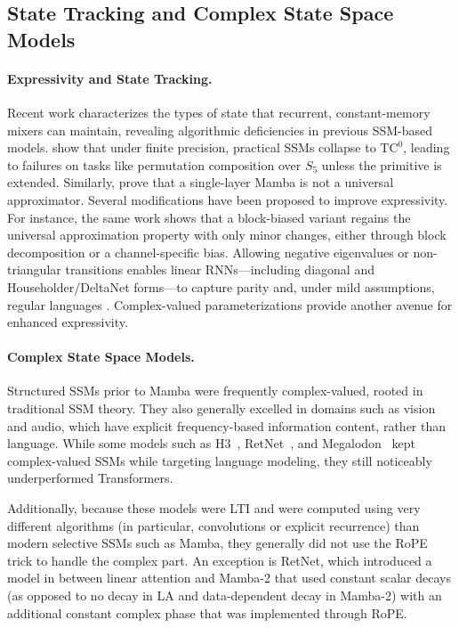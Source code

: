 \documentclass{article}
\newcommand{\citep}{\parencite}
\newcommand{\citet}{\textcite}
\theoremstyle{plain}
\theoremstyle{definition}
\theoremstyle{remark}
\begin{document}
\subsection{State Tracking and Complex State Space Models}

\paragraph{Expressivity and State Tracking.}
Recent work characterizes the types of state that recurrent, constant-memory mixers can maintain, revealing algorithmic deficiencies in previous SSM-based models. \citet{merrill2025illusionstatestatespacemodels} show that under finite precision, practical SSMs collapse to $\mathrm{TC}^0$, leading to failures on tasks like permutation composition over $S_5$ unless the primitive is extended.
Similarly, \citet{yu2025blockbiasedmamba} prove that a single-layer Mamba is not a universal approximator. Several modifications have been proposed to improve expressivity. For instance, the same work shows that a block-biased variant regains the universal approximation property with only minor changes, either through block decomposition or a channel-specific bias. Allowing negative eigenvalues or non-triangular transitions enables linear RNNs---including diagonal and Householder/DeltaNet forms---to capture parity and, under mild assumptions, regular languages \citep{grazzi2025unlockingstatetrackinglinearrnns}. Complex-valued parameterizations provide another avenue for enhanced expressivity.

\paragraph{Complex State Space Models.}
Structured SSMs prior to Mamba were frequently complex-valued, rooted in traditional SSM theory.
They also generally excelled in domains such as vision and audio, which have explicit frequency-based information content, rather than language.
While some models such as H3~\citep{fu2023hungryhungryhipposlanguage}, RetNet~\citep{sun2023retentivenetworksuccessortransformer}, and Megalodon~\citep{ma2024megalodonefficientllmpretraining} kept complex-valued SSMs while targeting language modeling, they still noticeably underperformed Transformers.

Additionally, because these models were LTI and were computed using very different algorithms (in particular, convolutions or explicit recurrence) than modern selective SSMs such as Mamba, they generally did not use the RoPE trick to handle the complex part.
An exception is RetNet, which introduced a model in between linear attention and Mamba-2 that used constant scalar decays (as opposed to no decay in LA and data-dependent decay in Mamba-2) with an additional constant complex phase that was implemented through RoPE.
\end{document}
